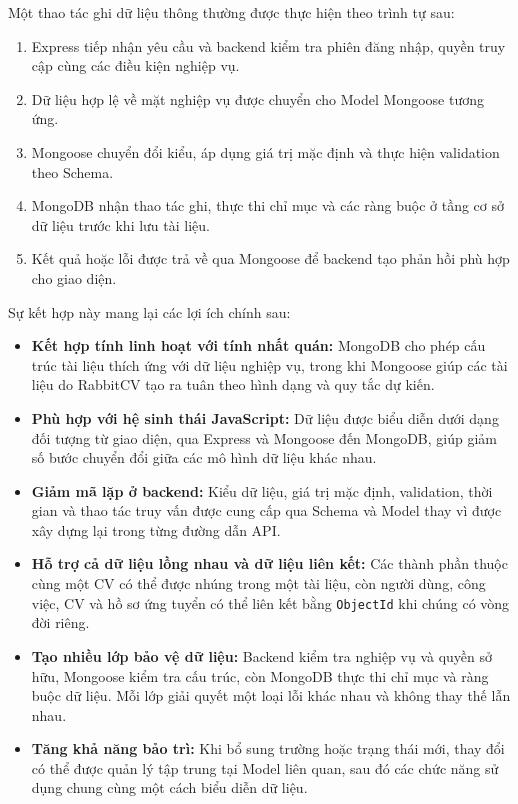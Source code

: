 Một thao tác ghi dữ liệu thông thường được thực hiện theo trình tự sau:

\begin{enumerate}
    \item Express tiếp nhận yêu cầu và backend kiểm tra phiên đăng nhập, quyền truy cập cùng các điều kiện nghiệp vụ.
    \item Dữ liệu hợp lệ về mặt nghiệp vụ được chuyển cho Model Mongoose tương ứng.
    \item Mongoose chuyển đổi kiểu, áp dụng giá trị mặc định và thực hiện validation theo Schema.
    \item MongoDB nhận thao tác ghi, thực thi chỉ mục và các ràng buộc ở tầng cơ sở dữ liệu trước khi lưu tài liệu.
    \item Kết quả hoặc lỗi được trả về qua Mongoose để backend tạo phản hồi phù hợp cho giao diện.
\end{enumerate}

Sự kết hợp này mang lại các lợi ích chính sau:

\begin{itemize}
    \item \textbf{Kết hợp tính linh hoạt với tính nhất quán:} MongoDB cho phép cấu trúc tài liệu thích ứng với dữ liệu nghiệp vụ, trong khi Mongoose giúp các tài liệu do RabbitCV tạo ra tuân theo hình dạng và quy tắc dự kiến.

    \item \textbf{Phù hợp với hệ sinh thái JavaScript:} Dữ liệu được biểu diễn dưới dạng đối tượng từ giao diện, qua Express và Mongoose đến MongoDB, giúp giảm số bước chuyển đổi giữa các mô hình dữ liệu khác nhau.

    \item \textbf{Giảm mã lặp ở backend:} Kiểu dữ liệu, giá trị mặc định, validation, thời gian và thao tác truy vấn được cung cấp qua Schema và Model thay vì được xây dựng lại trong từng đường dẫn API.

    \item \textbf{Hỗ trợ cả dữ liệu lồng nhau và dữ liệu liên kết:} Các thành phần thuộc cùng một CV có thể được nhúng trong một tài liệu, còn người dùng, công việc, CV và hồ sơ ứng tuyển có thể liên kết bằng \texttt{ObjectId} khi chúng có vòng đời riêng.

    \item \textbf{Tạo nhiều lớp bảo vệ dữ liệu:} Backend kiểm tra nghiệp vụ và quyền sở hữu, Mongoose kiểm tra cấu trúc, còn MongoDB thực thi chỉ mục và ràng buộc dữ liệu. Mỗi lớp giải quyết một loại lỗi khác nhau và không thay thế lẫn nhau.

    \item \textbf{Tăng khả năng bảo trì:} Khi bổ sung trường hoặc trạng thái mới, thay đổi có thể được quản lý tập trung tại Model liên quan, sau đó các chức năng sử dụng chung cùng một cách biểu diễn dữ liệu.
\end{itemize}

